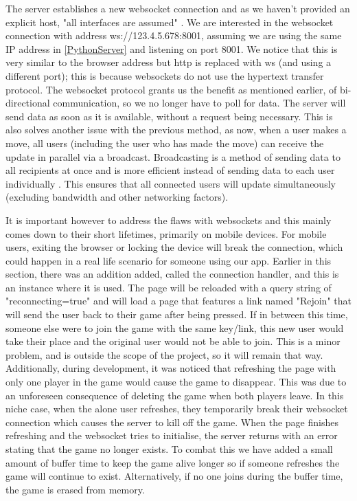 The server establishes a new websocket connection and as we haven't provided an explicit host, "all interfaces are assumed" \cite{NoHost}. We are interested in the websocket connection with address ws://123.4.5.678:8001, assuming we are using the same IP address in \ref{PythonServer} and listening on port 8001. We notice that this is very similar to the browser address but http is replaced with ws (and using a different port); this is because websockets do not use the hypertext transfer protocol. The websocket protocol grants us the benefit as mentioned earlier, of bi-directional communication, so we no longer have to poll for data. The server will send data as soon as it is available, without a request being necessary. This is also solves another issue with the previous method, as now, when a user makes a move, all users (including the user who has made the move) can receive the update in parallel via a broadcast. Broadcasting is a method of sending data to all recipients at once and is more efficient instead of sending data to each user individually \cite{Broadcast}. This ensures that all connected users will update simultaneously (excluding bandwidth and other networking factors).

It is important however to address the flaws with websockets and this mainly comes down to their short lifetimes, primarily on mobile devices. For mobile users, exiting the browser or locking the device will break the connection, which could happen in a real life scenario for someone using our app. Earlier in this section, there was an addition added, called the connection handler, and this is an instance where it is used. The page will be reloaded with a query string of "reconnecting=true" and will load a page that features a link named "Rejoin" that will send the user back to their game after being pressed. If in between this time, someone else were to join the game with the same key/link, this new user would take their place and the original user would not be able to join. This is a minor problem, and is outside the scope of the project, so it will remain that way. Additionally, during development, it was noticed that refreshing the page with only one player in the game would cause the game to disappear. This was due to an unforeseen consequence of deleting the game when both players leave. In this niche case, when the alone user refreshes, they temporarily break their websocket connection which causes the server to kill off the game. When the page finishes refreshing and the websocket tries to initialise, the server returns with an error stating that the game no longer exists. To combat this we have added a small amount of buffer time to keep the game alive longer so if someone refreshes the game will continue to exist. Alternatively, if no one joins during the buffer time, the game is erased from memory.

